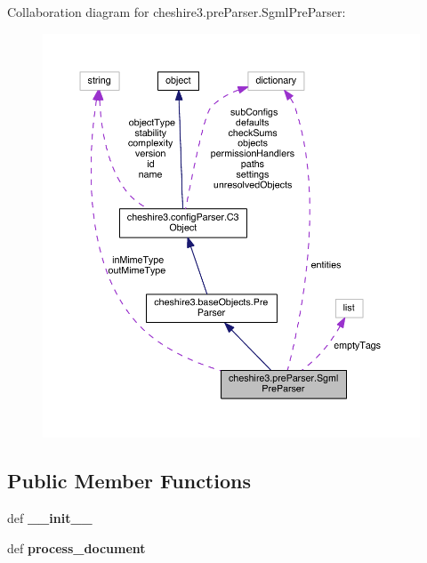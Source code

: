 Collaboration diagram for cheshire3.\-pre\-Parser.\-Sgml\-Pre\-Parser\-:
\nopagebreak
\begin{figure}[H]
\begin{center}
\leavevmode
\includegraphics[width=350pt]{classcheshire3_1_1pre_parser_1_1_sgml_pre_parser__coll__graph}
\end{center}
\end{figure}
\subsection*{Public Member Functions}
\begin{DoxyCompactItemize}
\item 
\hypertarget{classcheshire3_1_1pre_parser_1_1_sgml_pre_parser_a39c9546ca0925f974a1f9b61876104dc}{def {\bfseries \-\_\-\-\_\-init\-\_\-\-\_\-}}\label{classcheshire3_1_1pre_parser_1_1_sgml_pre_parser_a39c9546ca0925f974a1f9b61876104dc}

\item 
\hypertarget{classcheshire3_1_1pre_parser_1_1_sgml_pre_parser_a273d68720ed264d48121a3d95f08c319}{def {\bfseries process\-\_\-document}}\label{classcheshire3_1_1pre_parser_1_1_sgml_pre_parser_a273d68720ed264d48121a3d95f08c319}

\end{DoxyCompactItemize}

